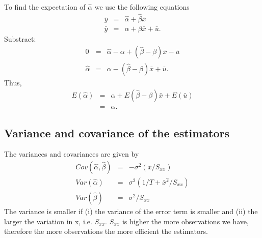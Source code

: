 \documentclass{article}
\begin{document}
To find the expectation of 
$\hat{\alpha}$ we use the following equations
\begin{eqnarray*}
\bar{y} &=&\hat{\alpha}+\hat{\beta}\bar{x} \\
\bar{y} &=&\alpha +\beta \bar{x}+\bar{u}.
\end{eqnarray*}%
Substract:
\begin{eqnarray}
0 &=&\hat{\alpha}-\alpha +\left( \hat{\beta}-\beta \right) \bar{x}-\bar{u} 
\nonumber \\
\hat{\alpha} &=&\alpha -( \hat{\beta}-\beta ) \bar{x}+\bar{u}.
\label{alphahat2}
\end{eqnarray}
Thus,
\begin{eqnarray*}
E\left( \hat{\alpha}\right) &=&\alpha +E( \hat{\beta}-\beta ) 
\bar{x}+E\left( \bar{u}\right) \\
&=&\alpha .
\end{eqnarray*}

\subsection*{Variance and covariance of the estimators}

The variances and covariances are given by
\begin{eqnarray*}
Cov(\hat{\alpha},\hat{\beta}) &=&-\sigma ^{2}\left( \bar{x}/S_{xx}\right) \\
Var(\hat{\alpha}) &=&\sigma ^{2}\left( 1/T+\bar{x}^{2}/S_{xx}\right) \\
Var(\hat{\beta}) &=&\sigma ^{2}/S_{xx}
\end{eqnarray*}
The variance is smaller if (i) the variance of the error term is smaller and (ii) the larger the variation in x, i.e. $S_{xx}$. $S_{xx}$ is higher the more observations we have, therefore the more observations the more efficient the estimators. 
\end{document}
